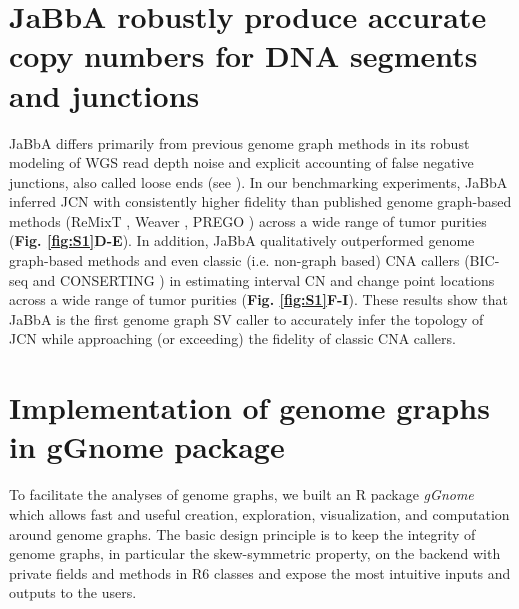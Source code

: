\documentclass[phd,tocprelim]{cornell}
\begin{document}
\section{JaBbA robustly produce accurate copy numbers for DNA segments and junctions}

JaBbA differs primarily from previous genome graph methods in its robust modeling of WGS read depth noise and explicit accounting of false negative junctions, also called loose ends (see ). In our benchmarking experiments, JaBbA inferred JCN with consistently higher fidelity than published genome graph-based methods (ReMixT \cite{McPherson2017-ry}, Weaver \cite{Li2016-qa}, PREGO \cite{Oesper2012-vw}) across a wide range of tumor purities (\textbf{Fig. \ref{fig:S1}D-E}). In addition, JaBbA qualitatively outperformed genome graph-based methods and even classic (i.e. non-graph based) CNA callers (BIC-seq \cite{Xi2011-oa} and CONSERTING \cite{Chen2015-sw}) in estimating interval CN and change point locations across a wide range of tumor purities (\textbf{Fig. \ref{fig:S1}F-I}). These results show that JaBbA is the first genome graph SV caller to accurately infer the topology of JCN while approaching (or exceeding) the fidelity of classic CNA callers. 




\section{Implementation of genome graphs in gGnome package}
To facilitate the analyses of genome graphs, we built an R package \textit{gGnome} which allows fast and useful creation, exploration, visualization, and computation around genome graphs. The basic design principle is to keep the integrity of genome graphs, in particular the skew-symmetric property, on the backend with private fields and methods in R6 classes and expose the most intuitive inputs and outputs to the users.
\end{document}
